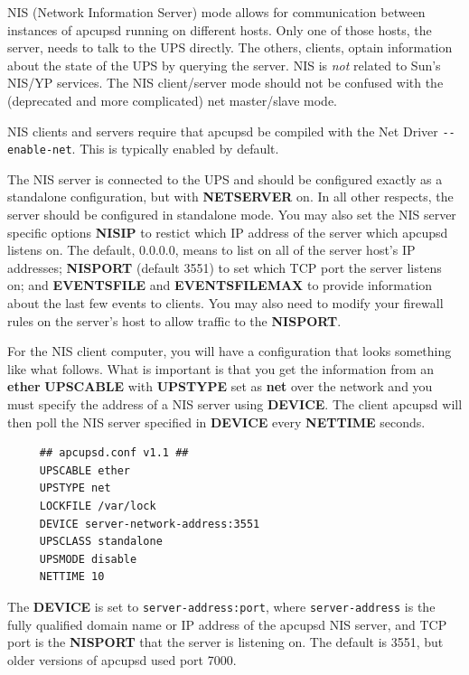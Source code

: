 \label{index-Example_002c-NIS-slave-81}
\label{index-NIS-slave-conf-82}
\label{index-Configuration_002c-NIS-slave-conf-83}

NIS (Network Information Server) mode allows for communication between
instances of apcupsd running on different hosts.  Only one of those
hosts, the server, needs to talk to the UPS directly.  The others,
clients, optain information about the state of the UPS by querying the
server.  NIS is \emph{not} related to Sun's NIS/YP services.  The NIS
client/server mode should not be confused with the (deprecated and more
complicated) net master/slave mode.

NIS clients and servers require that apcupsd be compiled with the Net
Driver \texttt{-{}-enable-net}.  This is typically enabled by default.

The NIS server is connected to the UPS and should be configured exactly
as a standalone configuration, but with \textbf{NETSERVER} on.  In all
other respects, the server should be configured in standalone mode.  You
may also set the NIS server specific options \textbf{NISIP} to
restict which IP address of the server which apcupsd listens on.  The
default, 0.0.0.0, means to list on all of the server host's IP addresses;
\textbf{NISPORT} (default 3551) to set which TCP port the server listens on;
and \textbf{EVENTSFILE} and \textbf{EVENTSFILEMAX} to provide information
about the last few events to clients.  You may also need to modify your
firewall rules on the server's host to allow traffic to the
\textbf{NISPORT}\@.

For the NIS client computer, you will have a configuration that looks something
like what follows.  What is important is that you get the information from an
\textbf{ether} \textbf{UPSCABLE} with \textbf{UPSTYPE} set as
\textbf{net} over the network and you must specify the address of a NIS
server using \textbf{DEVICE}\@. The client apcupsd will then poll the
NIS server specified in \textbf{DEVICE} every \textbf{NETTIME} seconds.

\footnotesize
\begin{verbatim}
     ## apcupsd.conf v1.1 ##
     UPSCABLE ether
     UPSTYPE net
     LOCKFILE /var/lock
     DEVICE server-network-address:3551
     UPSCLASS standalone
     UPSMODE disable
     NETTIME 10
\end{verbatim}
\normalsize

The \textbf{DEVICE} is set to \texttt{server-address:port}, where
\texttt{server-address} is the fully qualified domain name or IP address of
the apcupsd NIS server, and TCP port is the \textbf{NISPORT} that the server
is listening on.  The default is 3551, but older versions of apcupsd used
port 7000.  

